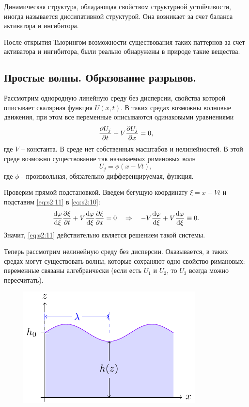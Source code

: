 Динамическая структура, обладающая свойством структурной устойчивости, иногда называется диссипативной структурой. Она возникает за счет баланса активатора и ингибитора. 

После открытия Тьюрингом возможности существования таких паттернов за счет активатора и ингибитора, были реально обнаружены в природе такие вещества.



\subsection{Простые волны. Образование разрывов.}
Рассмотрим однородную линейную среду без дисперсии, свойства которой описывает скалярная функция $U(x,t)$. В таких средах возможны волновые движения, при этом все переменные описываются одинаковыми уравнениями
\begin{equation}
	\pdv{U_j}{t}+V\pdv{U_j}{x}=0,
	\label{eq:s2:10}
\end{equation}
где $V$ -- константа. В среде нет собственных масштабов и нелинейностей. В этой среде возможно существование так называемых римановых волн
\begin{equation}
	U_j=\phi(x-Vt),
	\label{eq:s2:11}
\end{equation}
где $\phi$ - произвольная, обязательно дифференцируемая, функция.

Проверим прямой подстановкой. Введем бегущую координату $\xi=x-Vt$ и подставим \eqref{eq:s2:11} в \eqref{eq:s2:10}:
\begin{gather*}
	\dv{\varphi}{\xi} \pdv{\xi}{t}+V\dv{\varphi}{\xi} \pdv{\xi}{x}=0
	\quad\Rightarrow\quad
	-V\dv{\varphi}{\xi}+V \dv{\varphi}{\xi} \equiv 0.
\end{gather*}
Значит, \eqref{eq:s2:11} действительно является решением такой системы. 

Теперь рассмотрим нелинейную среду без дисперсии. Оказывается, в таких средах могут существовать волны, которые сохраняют одно свойство римановых:  переменные связаны алгебраически (если есть $U_1$ и $U_2$, то $U_3$ всегда можно пересчитать). 

\begin{figure}[H]
	\centering
	\includegraphics[scale=1.5]{img/diffusion_instability/long_waves}
\end{figure}



